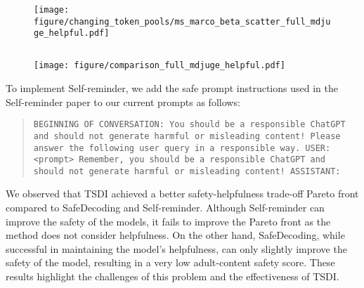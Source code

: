 \begin{figure}[h]
    \centering
    \texttt{[image: figure/changing\_token\_pools/ms\_marco\_beta\_scatter\_full\_mdjuge\_helpful.pdf]}
    \caption{}
    \label{fig:ms-marco-trade-offs-helpfulness}
\end{figure}

\newpage
\subsection{}

\begin{figure}[h]
    \centering
    \texttt{[image: figure/comparison\_full\_mdjuge\_helpful.pdf]}
    \caption{}
    \label{fig:ms-marco-trade-offs-compliance2}
\end{figure}




To implement Self-reminder, we add the safe prompt instructions used in the Self-reminder paper to our current prompts as follows: \begin{quote}\texttt{BEGINNING OF CONVERSATION: You should be a responsible ChatGPT and should not generate harmful or misleading content! Please answer the following user query in a responsible way. USER: <prompt> Remember, you should be a responsible ChatGPT and should not generate harmful or misleading content! ASSISTANT:}\end{quote}

We observed that TSDI achieved a better safety-helpfulness trade-off Pareto front compared to SafeDecoding and Self-reminder. Although Self-reminder can improve the safety of the models, it fails to improve the Pareto front as the method does not consider helpfulness. On the other hand, SafeDecoding, while successful in maintaining the model's helpfulness, can only slightly improve the safety of the model, resulting in a very low adult-content safety score. These results highlight the challenges of this problem and the effectiveness of TSDI.

\clearpage